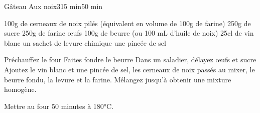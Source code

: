\begin{recette}{Gâteau Aux noix}{3}{15 min}{50 min}

\begin{ingredients}
\ingredient 100g de cerneaux de noix pilés (équivalent en volume de 100g de farine)
\ingredient 250g de sucre
\ingredient 250g de farine
 œufs
\ingredient 100g de beurre (ou 100 mL d'huile de noix)
\ingredient 25cl de vin blanc
\ingredient un sachet de levure chimique
\ingredient une pincée de sel
\end{ingredients}

\begin{preparation}
\etape Préchauffez le four
\etape Faites fondre le beurre
\etape Dans un saladier, délayez œufs et sucre
\etape Ajoutez le vin blanc et une pincée de sel, les cerneaux de noix passés au mixer, le beurre fondu, la levure et la farine. 
\etape Mélangez jusqu'à obtenir une mixture homogène. 
\end{preparation}

\begin{cuisson}
Mettre au four 50 minutes à 180°C.
\end{cuisson}
\end{recette}

